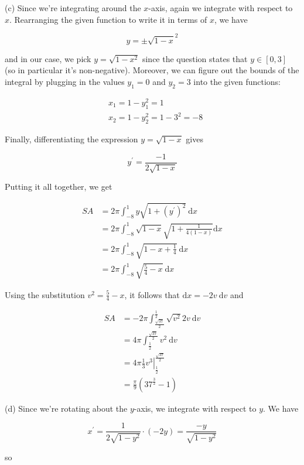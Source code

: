 \documentclass[10pt]{article}
\begin{document}
(c) Since we're integrating around the $x$-axis, again we integrate with respect to $x$. Rearranging the given function to write it in terms of $x$, we have

$$
y= \pm \sqrt{1-x}^{2}
$$

and in our case, we pick $y=\sqrt{1-x^{2}}$ since the question states that $y \in[0,3]$ (so in particular it's non-negative). Moreover, we can figure out the bounds of the integral by plugging in the values $y_{1}=0$ and $y_{2}=3$ into the given functions:

$$
\begin{aligned}
& x_{1}=1-y_{1}^{2}=1 \\
& x_{2}=1-y_{2}^{2}=1-3^{2}=-8
\end{aligned}
$$

Finally, differentiating the expression $y=\sqrt{1-x}$ gives

$$
y^{\prime}=\frac{-1}{2 \sqrt{1-x}}
$$

Putting it all together, we get

$$
\begin{aligned}
S A & =2 \pi \int_{-8}^{1} y \sqrt{1+\left(y^{\prime}\right)^{2}} \mathrm{~d} x \\
& =2 \pi \int_{-8}^{1} \sqrt{1-x} \sqrt{1+\frac{1}{4(1-x)}} \mathrm{d} x \\
& =2 \pi \int_{-8}^{1} \sqrt{1-x+\frac{1}{4}} \mathrm{~d} x \\
& =2 \pi \int_{-8}^{1} \sqrt{\frac{5}{4}-x} \mathrm{~d} x
\end{aligned}
$$

Using the substitution $v^{2}=\frac{5}{4}-x$, it follows that $\mathrm{d} x=-2 v \mathrm{~d} v$ and

$$
\begin{aligned}
S A & =-2 \pi \int_{\frac{\sqrt{37}}{2}}^{\frac{1}{2}} \sqrt{v^{2}} 2 v \mathrm{~d} v \\
& =4 \pi \int_{\frac{1}{2}}^{\frac{\sqrt{37}}{2}} v^{2} \mathrm{~d} v \\
& =\left.4 \pi \frac{1}{3} v^{3}\right|_{\frac{1}{2}} ^{\frac{\sqrt{37}}{2}} \\
& =\frac{\pi}{9}\left(37^{\frac{3}{2}}-1\right)
\end{aligned}
$$

(d) Since we're rotating about the $y$-axis, we integrate with respect to $y$. We have

$$
x^{\prime}=\frac{1}{2 \sqrt{1-y^{2}}} \cdot(-2 y)=\frac{-y}{\sqrt{1-y^{2}}}
$$

so
\end{document}
